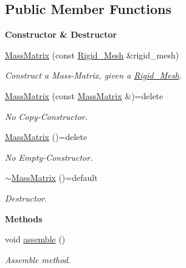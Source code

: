 \subsection*{Public Member Functions}
\begin{Indent}{\bf Constructor \& Destructor}\par
\begin{DoxyCompactItemize}
\item 
\hyperlink{classFVCode3D_1_1MassMatrix_a3ecd5e64fd653d9b9af004cae2f7bdd0}{Mass\+Matrix} (const \hyperlink{classFVCode3D_1_1Rigid__Mesh}{Rigid\+\_\+\+Mesh} \&rigid\+\_\+mesh)
\begin{DoxyCompactList}\small\item\em Construct a Mass-\/\+Matrix, given a \hyperlink{classFVCode3D_1_1Rigid__Mesh}{Rigid\+\_\+\+Mesh}. \end{DoxyCompactList}\item 
\hyperlink{classFVCode3D_1_1MassMatrix_a4522c58100682a2d86845eb3f06eb625}{Mass\+Matrix} (const \hyperlink{classFVCode3D_1_1MassMatrix}{Mass\+Matrix} \&)=delete
\begin{DoxyCompactList}\small\item\em No Copy-\/\+Constructor. \end{DoxyCompactList}\item 
\hyperlink{classFVCode3D_1_1MassMatrix_afc0767001d4b00b1b6fe68b844d9938a}{Mass\+Matrix} ()=delete
\begin{DoxyCompactList}\small\item\em No Empty-\/\+Constructor. \end{DoxyCompactList}\item 
\hyperlink{classFVCode3D_1_1MassMatrix_a689a8957bdc84140477082bc48762011}{$\sim$\+Mass\+Matrix} ()=default
\begin{DoxyCompactList}\small\item\em Destructor. \end{DoxyCompactList}\end{DoxyCompactItemize}
\end{Indent}
\begin{Indent}{\bf Methods}\par
\begin{DoxyCompactItemize}
\item 
void \hyperlink{classFVCode3D_1_1MassMatrix_ac5f8226ecd4e8d193bfe1bd87c0918e4}{assemble} ()
\begin{DoxyCompactList}\small\item\em Assemble method. \end{DoxyCompactList}\end{DoxyCompactItemize}
\end{Indent}
